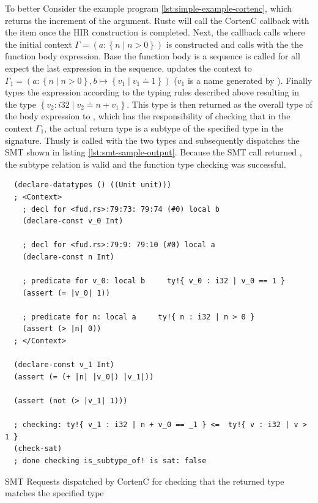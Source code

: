 \documentclass[twoside, english, final]{sdqthesis}
\newcommand{\set}[1]{\left\{ #1 \right\}}
\theoremstyle{definition}
\begin{document}
To better 
Consider the example program \ref{lst:simple-example-cortenc}, which returns the increment of the argument.
Rustc will call the CortenC callback with the item  once the HIR construction is completed. Next, the callback calls  where the initial context $\Gamma = ( a : \set{n \mid n > 0})$ is constructed and calls  with the the function body expression. Base the function body is a sequence  is called for all expect the last expression in the sequence.  updates the context to $\Gamma_1 = (a : \set{n \mid n > 0}, b \mapsto \set{v_1 \mid v_1 \doteq 1})$ ($v_1$ is a name generated by ). 
Finally  types the expression  according to the typing rules described above resulting in the type $\set{ v_2 : i32 \mid v_2 \doteq n + v_1}$.
This type is then returned as the overall type of the body expression to , which has the responsibility of checking that in the context $\Gamma_1$, the actual return type is a subtype of the specified type in the signature. 
Thusly  is called with the two types and subsequently dispatches the SMT shown in listing \ref{lst:smt-sample-output}. 
Because the SMT call returned , the subtype relation is valid and the function type checking was successful.


\begin{listing}[h]
  \begin{verbatim}
  (declare-datatypes () ((Unit unit)))
  ; <Context>
    ; decl for <fud.rs>:79:73: 79:74 (#0) local b
    (declare-const v_0 Int)
    
    ; decl for <fud.rs>:79:9: 79:10 (#0) local a
    (declare-const n Int)
    
    ; predicate for v_0: local b     ty!{ v_0 : i32 | v_0 == 1 }
    (assert (= |v_0| 1))
    
    ; predicate for n: local a     ty!{ n : i32 | n > 0 }
    (assert (> |n| 0))
  ; </Context>

  (declare-const v_1 Int)
  (assert (= (+ |n| |v_0|) |v_1|))
  
  (assert (not (> |v_1| 1)))
  
  ; checking: ty!{ v_1 : i32 | n + v_0 == _1 } <=  ty!{ v : i32 | v > 1 }
  (check-sat)
  ; done checking is_subtype_of! is sat: false
  \end{verbatim}
  \caption{SMT Requests dispatched by CortenC for checking that the returned type matches the specified type}
  \label{lst:smt-sample-output}
\end{listing}
\end{document}
